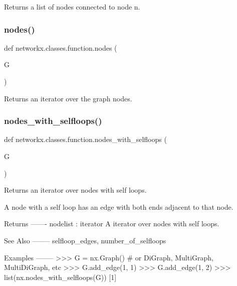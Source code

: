 \begin{DoxyVerb}Returns a list of nodes connected to node n.\end{DoxyVerb}
 \mbox{\label{namespacenetworkx_1_1classes_1_1function_a13ec9e314635ecbb194fe675b544d3e5}} 
\subsubsection{\texorpdfstring{nodes()}{nodes()}}
{\footnotesize\ttfamily def networkx.\+classes.\+function.\+nodes (\begin{DoxyParamCaption}\item[{}]{G }\end{DoxyParamCaption})}

\begin{DoxyVerb}Returns an iterator over the graph nodes.\end{DoxyVerb}
 \mbox{\label{namespacenetworkx_1_1classes_1_1function_a78924acdc608361a17669da3ebe59b46}} 
\subsubsection{\texorpdfstring{nodes\+\_\+with\+\_\+selfloops()}{nodes\_with\_selfloops()}}
{\footnotesize\ttfamily def networkx.\+classes.\+function.\+nodes\+\_\+with\+\_\+selfloops (\begin{DoxyParamCaption}\item[{}]{G }\end{DoxyParamCaption})}

\begin{DoxyVerb}Returns an iterator over nodes with self loops.

A node with a self loop has an edge with both ends adjacent
to that node.

Returns
-------
nodelist : iterator
    A iterator over nodes with self loops.

See Also
--------
selfloop_edges, number_of_selfloops

Examples
--------
>>> G = nx.Graph()  # or DiGraph, MultiGraph, MultiDiGraph, etc
>>> G.add_edge(1, 1)
>>> G.add_edge(1, 2)
>>> list(nx.nodes_with_selfloops(G))
[1]\end{DoxyVerb}
 \mbox{\label{namespacenetworkx_1_1classes_1_1function_a35786196acc54b50940475a34415ddfc}} 
